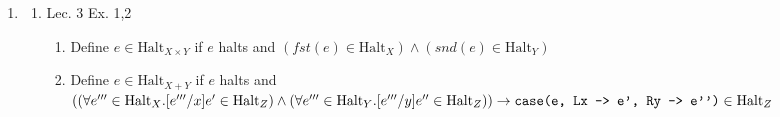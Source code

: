 \documentclass[10pt, a4paper]{article}
\begin{document}
\begin{enumerate}

\item 
\begin{enumerate}

\item 
Lec. 3 Ex. 1,2
\begin{enumerate}
	\item Define $e \in \text{Halt}_{X \times Y}$ if $e$ halts and 
	$(fst(e) \in \text{Halt}_X ) \wedge (snd(e) \in \text{Halt}_Y )$
	
	
	\item Define $e \in \text{Halt}_{X+Y}$ if $e$ halts and  
	$((\forall e''' \in \text{Halt}_X . [e'''/x]e' \in \text{Halt}_Z ) \wedge (\forall e''' \in \text{Halt}_Y . [e'''/y]e'' \in \text{Halt}_Z )) \rightarrow 
	\verb|case(e, Lx -> e', Ry -> e'')| \in \text{Halt}_Z $ \\
	
\end{enumerate}



\end{enumerate}
\end{enumerate}
\end{document}
